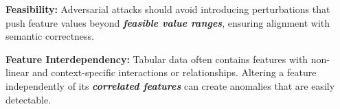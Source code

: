 \documentclass[portrait,a0paper]{baposter}
\begin{document}
\begin{poster}
{\vspace{0.3em}
\textbf{\color{blue}Feasibility:} Adversarial attacks should avoid introducing perturbations that push feature values beyond \textbf{\textit{feasible value ranges}}, ensuring alignment with semantic correctness.

\vspace{0.3em}
\textbf{\color{blue}Feature Interdependency:} Tabular data often contains features with non-linear and context-specific interactions or relationships. Altering a feature independently of its \textbf{\textit{correlated features}} can create anomalies that are easily detectable.



}

\end{poster}
\end{document}
